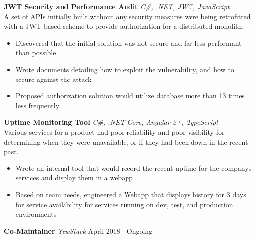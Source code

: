\documentclass[a4paper]{article}
\begin{document}
\begin{addmargin}[1em]{2em}%
{\textbf{JWT Security and Performance Audit}} {\sl C\#, .NET, JWT, JavaScript} \\
A set of APIs initially built without any security measures were being retrofitted with a JWT-based scheme to provide authorization for a distributed monolith.
\vspace*{-2mm}
\begin{itemize}[leftmargin=4.5mm] \itemsep -1mm
	\item Discovered that the initial solution was not secure and far less performant than possible
	\item Wrote documents detailing how to exploit the vulnerability, and how to secure against the attack%
    \item Proposed authorization solution would utilize database more than 13 times less frequently
\end{itemize}
\vspace*{2mm}

{\textbf{Uptime Monitoring Tool}} {\sl C\#, .NET Core, Angular 2+, TypeScript} \\
Various services for a product had poor reliability and poor visibility for determining when they were unavailable, or if they had been down in the recent past.
\vspace*{-2mm}
\begin{itemize}[leftmargin=4.5mm] \itemsep -1mm 
	\item Wrote an internal tool that would record the recent uptime for the company\textquotesingle{}s services and display them in a webapp
    \item Based on team needs, engineered a Webapp that displays history for 3 days for service availability for services running on dev, test, and production environments
\end{itemize}
\vspace*{2mm}
\end{addmargin}





\textbf{Co-Maintainer} \textit{YewStack} \hfill April 2018 - Ongoing\\
\end{document}
